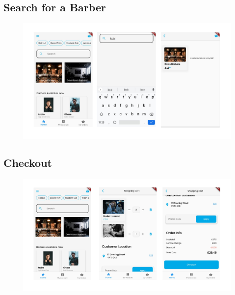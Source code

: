 \documentclass[12pt]{article}
\begin{document}
	\subsection{Search for a Barber}
	\label{app-image: search}
	\begin{figure}[H]
		\centering
		\includegraphics[scale=0.22]{images/search.png}
	\end{figure}

	\subsection{Checkout}
	\label{app-image: checkout}
	\begin{figure}[H]
		\centering
		\includegraphics[scale=0.22]{images/checkout.png}
	\end{figure}
\end{document}
